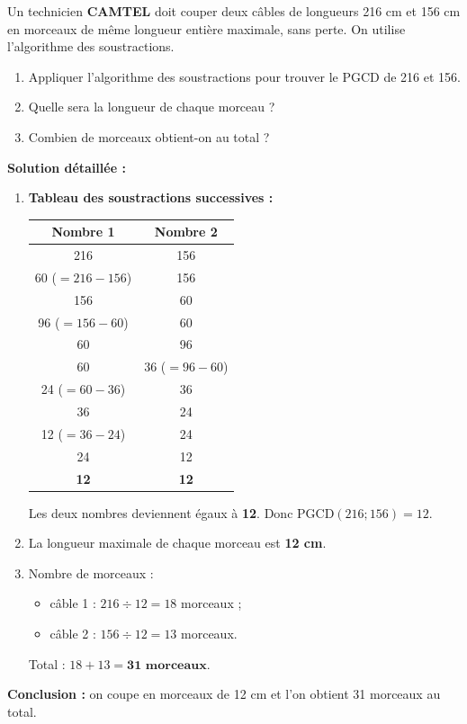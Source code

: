 \documentclass[11pt]{article}
\begin{document}
\begin{exoresolu}
Un technicien \textbf{CAMTEL} doit couper deux câbles de longueurs \num{216} cm et \num{156} cm en morceaux de même longueur entière maximale, sans perte. On utilise l'algorithme des soustractions.
\begin{enumerate}
    \item Appliquer l'algorithme des soustractions pour trouver le PGCD de 216 et 156.
    \item Quelle sera la longueur de chaque morceau ?
    \item Combien de morceaux obtient-on au total ?
\end{enumerate}
\tcblower
\textbf{Solution détaillée :}
\begin{enumerate}
    \item \textbf{Tableau des soustractions successives :}
    \begin{center}
    \begin{tabular}{|c|c|}\hline
    \textbf{Nombre 1} & \textbf{Nombre 2} \\ \hline
    216 & 156 \\ \hline
    60 ($=216-156$) & 156 \\ \hline
    156 & 60 \\ \hline
    96 ($=156-60$) & 60 \\ \hline
    60 & 96 \\ \hline
    60 & 36 ($=96-60$) \\ \hline
    24 ($=60-36$) & 36 \\ \hline
    36 & 24 \\ \hline
    12 ($=36-24$) & 24 \\ \hline
    24 & 12 \\ \hline
    \textbf{12} & \textbf{12} \\ \hline
    \end{tabular}
    \end{center}
    Les deux nombres deviennent égaux à \textbf{12}.
    Donc $\text{PGCD}(216; 156) = 12$.
    \item La longueur maximale de chaque morceau est \textbf{12 cm}.
    \item Nombre de morceaux :
    \begin{itemize}
        \item câble 1 : $216 \div 12 = 18$ morceaux ;
        \item câble 2 : $156 \div 12 = 13$ morceaux.
    \end{itemize}
    Total : $18 + 13 = \textbf{31 morceaux}$.
\end{enumerate}
\textbf{Conclusion :} on coupe en morceaux de 12 cm et l'on obtient 31 morceaux au total.
\end{exoresolu}
\end{document}
